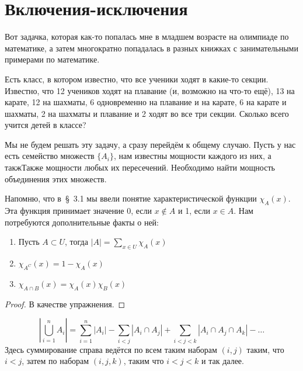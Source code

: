 \section{Включения-исключения}

Вот задачка, которая как-то попалась мне в младшем возрасте на олимпиаде по математике, а затем многократно попадалась в разных книжках с занимательными примерами по математике.

Есть класс, в котором известно, что все ученики ходят в какие-то секции. Известно, что 12 учеников ходят на плавание (и, возможно на что-то ещё), 13 на карате, 12 на шахматы, 6 одновременно на плавание и на карате, 6 на карате и шахматы, 2 на шахматы и плавание и 2 ходят во все три секции. Сколько всего учится детей в классе?

Мы не будем решать эту задачу, а сразу перейдём к общему случаю. Пусть у нас есть семейство множеств $\{A_i\}$, нам известны мощности каждого из них, а такжТакже мощности любых их пересечений. Необходимо найти мощность объединения этих множеств.

Напомню, что в~\S~3.1 мы ввели понятие характеристической функции $\chi_A(x)$. Эта функция принимает значение 0, если $x\not\in A$ и 1, если $x\in A$. Нам потребуются дополнительные факты о ней:

\begin{thm}
\begin{enumerate}
\item Пусть $A\subset U$, тогда $|A| = \sum_{x\in U} \chi_A(x)$
\item $\chi_{A^C}(x) = 1 - \chi_A(x)$
\item $\chi_{A\cap B}(x) = \chi_A(x)\chi_B(x)$ 
\end{enumerate}
\end{thm}
\begin{proof}
В качестве упражнения.
\end{proof}

\begin{thm}
$$\left|\bigcup_{i=1}^n A_i \right|= \sum_{i=1}^n|A_i| - \sum_{i<j}|A_i\cap A_j| + \sum_{i<j<k}|A_i\cap A_j\cap A_k| -\ldots$$
Здесь суммирование справа ведётся по всем таким наборам $(i, j)$ таким, что $i<j$, затем по наборам $(i,j,k)$, таким что $i<j<k$ и так далее.
\end{thm}

